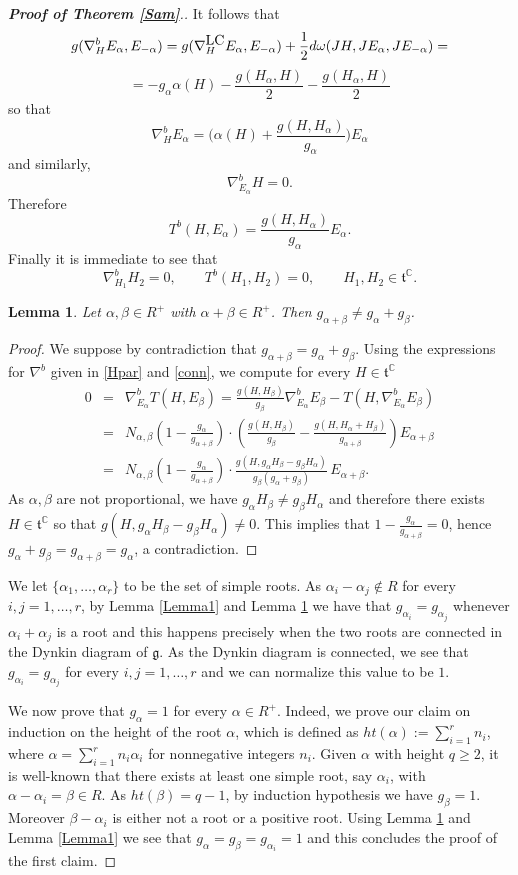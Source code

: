 \documentclass{amsart}
\numberwithin{equation}{section}
\newtheorem{lemma}  [theorem]     {Lemma}
\theoremstyle{definition}
\renewcommand{\1}{\mathds{1}}
\renewcommand{\a}{\alpha}
\renewcommand{\b}{\beta}
\renewcommand{\o}{\omega}
\renewcommand{\gg}{\mathfrak g}
\newcommand{\gt}{\mathfrak t}
\renewcommand{\>}{\rightarrow}
\begin{document}
\begin{proof}[{\bf Proof of Theorem \ref{Sam}}.]
It follows that
$$g(\nabla^b_HE_\a,E_{-\a}) = g(\nabla^{\mbox{\tiny LC}}_HE_\a,E_{-\a}) +\frac 12 d\o(JH,JE_\a,JE_{-\a}) =$$
$$=-g_\a\a(H)-\frac{g(H_\a,H)}{2}-\frac{g(H_\a,H)}{2} $$
so that
\begin{equation}\nabla^b_HE_\a = \big(\a(H)+\frac{g(H,H_\a)}{g_\a}\big) E_\a\end{equation}
and similarly,
\begin{equation}\label{Hpar}\nabla^b_{E_\a}H = 0.\end{equation}
Therefore
$$T^b(H,E_\a) = \frac{g(H,H_\a)}{g_\a} E_\a. $$
Finally it is immediate to see that
$$\nabla^b_{H_1}H_2 = 0,\qquad T^b(H_1,H_2)=0,\qquad H_1,H_2\in \gt^{\mathbb C}.$$

\begin{lemma}\label{altern} Let $\a,\b\in R^+$ with $\a+\b\in R^+$. Then $g_{\a+\b}\neq g_\a+g_\b$.
\end{lemma}
\begin{proof} We suppose by contradiction that $g_{\a+\b}= g_\a+g_\b$. Using the expressions for $\nabla^b$ given in \eqref{Hpar} and \eqref{conn}, we compute for every $H\in \gt^{\mathbb C}$
\begin{eqnarray*} 0&=&\nabla^b_{E_\a}T(H,E_\b) = \frac{g(H,H_\b)}{g_\b}\nabla^b_{E_\a}E_\b - T(H,\nabla^b_{E_\a}E_\b)\\
&=& N_{\a,\b}\left(1-\frac{g_\a}{g_{\a+\b}}\right)\cdot\left(\frac{g(H,H_\b)}{g_\b}-\frac{g(H,H_\a+H_\b)}{g_{\a+\b}}\right) E_{\a+\b}\\
&=& N_{\a,\b}\left(1-\frac{g_\a}{g_{\a+\b}}\right)\cdot\frac{g(H,g_\a H_\b-g_\b H_\a)}{g_\b(g_\a+g_\b)}\, E_{\a+\b}.
\end{eqnarray*}
As $\a,\b$ are not proportional, we have $g_\a H_\b\neq g_\b H_\a$ and therefore there exists $H\in \gt^\mathbb C$ so that $g(H,g_\a H_\b-g_\b H_\a)\neq 0$. This implies that $1-\frac{g_\a}{g_{\a+\b}}=0$, hence $g_\a +g_\b = g_{\a+\b}=g_\a$, a contradiction. \end{proof}
We let $\{\a_1,\ldots,\a_r\}$ to be the set of simple roots. As $\a_i-\a_j\not\in R$ for every $i,j=1,\ldots,r$, by Lemma \ref{Lemma1} and Lemma \ref{altern} we have that $g_{\a_i}=g_{\a_j}$ whenever $\a_i+\a_j$ is a root and this happens precisely when the two roots are connected in the Dynkin diagram of $\gg$. As the Dynkin diagram is connected, we see that $g_{\a_i}=g_{\a_j}$ for every $i,j=1,\ldots,r$ and we can normalize this value to be $1$.\par
We now prove that $g_\a=1$ for every $\a\in R^+$. Indeed, we prove our claim on induction on the height of the root $\a$, which is defined as $ht(\a):=\sum_{i=1}^rn_i$, where
$\a=\sum_{i=1}^r n_i\a_i$ for nonnegative integers $n_i$. Given $\a$ with height $q\geq 2$, it is well-known that there exists at least one simple root, say $\a_i$, with $\a-\a_i=\b\in R$. As $ht(\b) = q-1$, by induction hypothesis we have $g_\b=1$. Moreover $\b-\a_i$ is either not a root or a positive root. Using Lemma \ref{altern} and Lemma \ref{Lemma1} we see that $g_\a=g_\b=g_{\a_i}=1$ and this concludes the proof of the first claim.


\end{proof}
\end{document}
